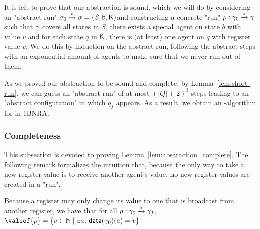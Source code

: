 
It is left to prove that our abstraction is sound, which we will do by considering an "abstract run" $\sigma_0 \xrightarrow{\ast} \sigma = (S, \mathsf{b}, \mathsf{K})$and constructing a concrete "run" $\rho : \gamma_0 \xrightarrow{\ast} \gamma $ such that $\gamma$ covers all states in $S$, there exists a special agent on state $b$ with value $v$ and for each state $q$ in $\mathsf{K}$, there is (at least) one agent on $q$ with register value $v$. We do this by induction on the abstract run, following the abstract steps with an exponential amount of agents to make sure that we never run out of them.

As we proved our abstraction to be sound and complete, by Lemma~\ref{lem:short-run}, we can guess an "abstract run" of at most $(|Q| + 2)^3$ steps leading to an "abstract configuration" in which $q_f$ appears. As a result, we obtain an \NP-algorithm for \COVER in 1BNRA.


\subsubsection{Completeness}
\label{one-completeness}

This subsection is devoted to proving Lemma~\ref{lem:abstraction_complete}.
The following remark formalizes the intuition that, because the only way to take a new register value is to receive another agent's value, no new register values are created in a "run".
\begin{remark}
	\label{rem:run_no_new_register_values}
	Because a register may only change its value to one that is broadcast from another register, we have that for all $\rho: \gamma_0 \xrightarrow{*} \gamma_f$, $\valsof{\run} = \set{\aval \in \nats \mid \exists a, \, \data{\config_0}(a) = \aval}$.
\end{remark}



